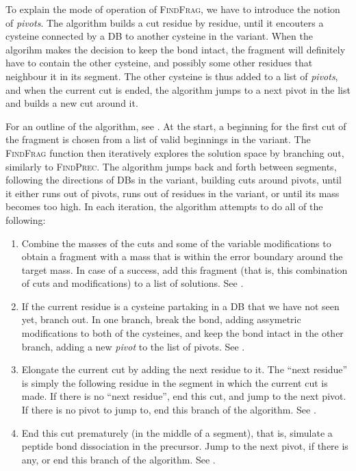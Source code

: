 To explain the mode of operation of \textsc{FindFrag}, we have to introduce the notion of \emph{pivots}. The algorithm builds a cut residue by residue, until it encouters a cysteine connected by a DB to another cysteine in the variant. When the algorihm makes the decision to keep the bond intact, the fragment will definitely have to contain the other cysteine, and possibly some other residues that neighbour it in its segment. The other cysteine is thus added to a list of \emph{pivots}, and when the current cut is ended, the algorithm jumps to a next pivot in the list and builds a new cut around it.

For an outline of the algorithm, see . At the start, a beginning for the first cut of the fragment is chosen from a list of valid beginnings in the variant. The \textsc{FindFrag} function then iteratively explores the solution space by branching out, similarly to \textsc{FindPrec}. The algorithm jumps back and forth between segments, following the directions of DBs in the variant, building cuts around pivots, until it either runs out of pivots, runs out of residues in the variant, or until its mass becomes too high. In each iteration, the algorithm attempts to do all of the following:

\begin{enumerate}
	\item Combine the masses of the  cuts and some of the variable modifications to obtain a fragment with a mass that is within the error boundary around the target mass. In case of a success, add this fragment (that is, this combination of cuts and modifications) to a list of solutions. See .
	\item If the current residue is a cysteine partaking in a DB that we have not seen yet, branch out. In one branch, break the bond, adding assymetric modifications to both of the cysteines, and keep the bond intact in the other branch, adding a new \emph{pivot} to the list of pivots. See .
	\item Elongate the current cut by adding the next residue to it. The ``next residue'' is simply the following residue in the segment in which the current cut is made. If there is no ``next residue'', end this cut, and jump to the next pivot. If there is no pivot to jump to, end this branch of the algorithm. See .
	\item End this cut prematurely (in the middle of a segment), that is, simulate a peptide bond dissociation in the precursor. Jump to the next pivot, if there is any, or end this branch of the algorithm. See .
\end{enumerate}

